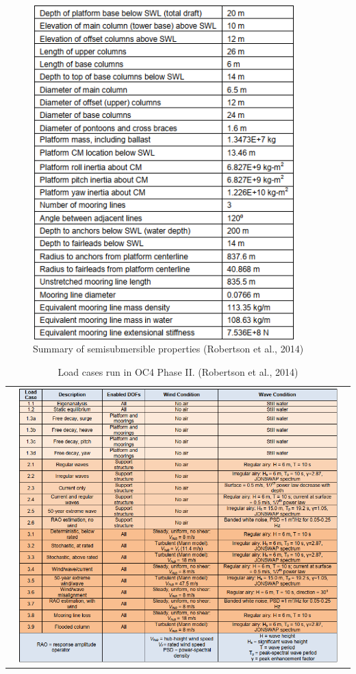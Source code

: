 \documentclass[a4paper]{article}
\begin{document}
\begin{figure}[htbp]
\begin{minipage}{0.5\textwidth}
        \includegraphics[width=0.9\textwidth]{characteristics.png}
        \caption{\small Summary of semisubmersible properties (Robertson et al., 2014)}
        \label{fig:characteristics}
    \end{minipage}
\end{figure}

\begin{table}[H]
    \centering
    \caption{Load cases run in OC4 Phase II. (Robertson et al., 2014)}
    \label{tab:image_table}
    \begin{tabular}{c}
        \includegraphics[width=0.95\textwidth]{table_3.png} \\
    \end{tabular}
\end{table}
\end{document}
